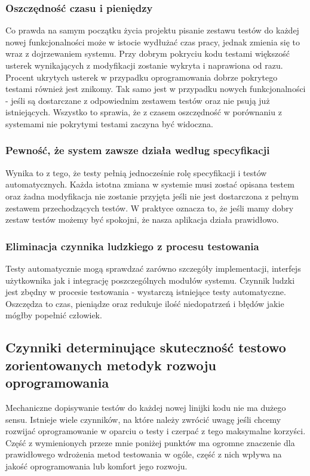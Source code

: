   \subsubsection{Oszczędność czasu i pieniędzy}
  Co prawda na samym początku życia projektu pisanie zestawu testów do każdej nowej funkcjonalności może w istocie wydłużać czas pracy, jednak zmienia się to wraz z dojrzewaniem systemu. Przy dobrym pokryciu kodu testami większość usterek wynikających z modyfikacji zostanie wykryta i naprawiona od razu. Procent ukrytych usterek w przypadku oprogramowania dobrze pokrytego testami również jest znikomy. Tak samo jest w przypadku nowych funkcjonalności - jeśli są dostarczane z odpowiednim zestawem testów oraz nie psują już istniejących. Wszystko to sprawia, że z czasem oszczędność w porównaniu z systemami nie pokrytymi testami zaczyna być widoczna.
  
  \subsubsection{Pewność, że system zawsze działa według specyfikacji}
  Wynika to z tego, że testy pełnią jednocześnie rolę specyfikacji i testów automatycznych. Każda istotna zmiana w systemie musi zostać opisana testem oraz żadna modyfikacja nie zostanie przyjęta jeśli nie jest dostarczona z pełnym zestawem przechodzących testów. W praktyce oznacza to, że jeśli mamy dobry zestaw testów możemy być spokojni, że nasza aplikacja działa prawidłowo.
  
  \subsubsection{Eliminacja czynnika ludzkiego z procesu testowania}
  Testy automatycznie mogą sprawdzać zarówno szczegóły implementacji, interfejs użytkownika jak i integrację poszczególnych modułów systemu. Czynnik ludzki jest zbędny w procesie testowania - wystarczą istniejące testy automatyczne. Oszczędza to czas, pieniądze oraz redukuje ilość niedopatrzeń i błędów jakie mógłby popełnić człowiek.
    
  \subsection{Czynniki determinujące skuteczność testowo zorientowanych metodyk rozwoju oprogramowania}
  Mechaniczne dopisywanie testów do każdej nowej linijki kodu nie ma dużego sensu. Istnieje wiele czynników, na które należy zwrócić uwagę jeśli chcemy rozwijać oprogramowanie w oparciu o testy i czerpać z tego maksymalne korzyści. Część z wymienionych przeze mnie poniżej punktów ma ogromne znaczenie dla prawidłowego wdrożenia metod testowania w ogóle, część z nich wpływa na jakość oprogramowania lub komfort jego rozwoju.
  
